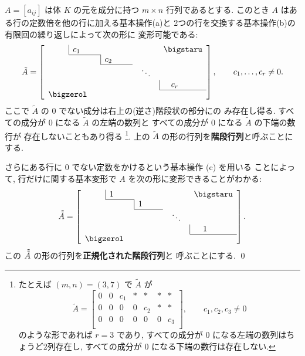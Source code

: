 \documentclass[12pt,twoside]{jarticle}
\begin{document}
\begin{question}[行に関する基本変形による階段行列への変換, 20点]
  \label{q:PA}
  $A=[a_{ij}]$ は体 $K$ の元を成分に持つ $m\times n$ 行列であるとする.
  このとき $A$ はある行の定数倍を他の行に加える基本操作(a)と
  2つの行を交換する基本操作(b)の有限回の繰り返しによって次の形に
  変形可能である:
  \begin{equation*}
    \tilde{A} = 
    \left[
      \begin{array}{ccccc}
        \multicolumn{1}{c|}{\qquad} & c_1 \qquad & & & \bigstaru \\
        \cline{2-2}
        \multicolumn{2}{c|}{} & c_2 \qquad & & \\
        \cline{3-3}
        \multicolumn{3}{c}{} & \;\;\ddots\;\; & \\
        \multicolumn{4}{c|}{} & c_r \qquad \\
        \cline{5-5}
        \multicolumn{5}{l}{\bigzerol} \\
      \end{array}
    \right],
    \qquad c_1,\ldots,c_r\ne 0.
  \end{equation*}
  ここで $\tilde{A}$ の $0$ でない成分は右上の(逆さ)階段状の部分にの
  み存在し得る.
  すべての成分が $0$ になる $\tilde{A}$ の左端の数列と
  すべての成分が $0$ になる $\tilde{A}$ の下端の数行が
  存在しないこともあり得る%
  \footnote{たとえば $(m,n)=(3,7)$ で $\tilde{A}$ が
    \begin{equation*}
      \tilde{A} = 
      \begin{bmatrix}
        0 & 0 & c_1 & * & *   & * & *   \\
        0 & 0 & 0   & 0 & c_2 & * & *   \\
        0 & 0 & 0   & 0 & 0   & 0 & c_3 \\
      \end{bmatrix},
      \qquad
      c_1,c_2,c_3\ne 0
    \end{equation*}
    のような形であれば $r=3$ であり, 
    すべての成分が $0$ になる左端の数列はちょうど2列存在し, 
    すべての成分が $0$ になる下端の数行は存在しない.}.
  上の $\tilde{A}$ の形の行列を{\bf 階段行列}と呼ぶことにする.

  さらにある行に $0$ でない定数をかけるという基本操作 (c) を用いる
  ことによって,  
  行だけに関する基本変形で $A$ を次の形に変形できることがわかる:
  \begin{equation*}
    \Tilde{\Tilde{A}} = 
    \left[
      \begin{array}{ccccc}
        \multicolumn{1}{c|}{\qquad} & 1 \qquad & & & \bigstaru \\
        \cline{2-2}
        \multicolumn{2}{c|}{} & 1 \qquad & & \\
        \cline{3-3}
        \multicolumn{3}{c}{} & \;\;\ddots\;\; & \\
        \multicolumn{4}{c|}{} & 1 \qquad \\
        \cline{5-5}
        \multicolumn{5}{l}{\bigzerol} \\
      \end{array}
    \right]. 
  \end{equation*}
  この $\Tilde{\Tilde{A}}$ の形の行列を{\bf 正規化された階段行列}と
  呼ぶことにする.
  \qed
\end{question}
\end{document}
